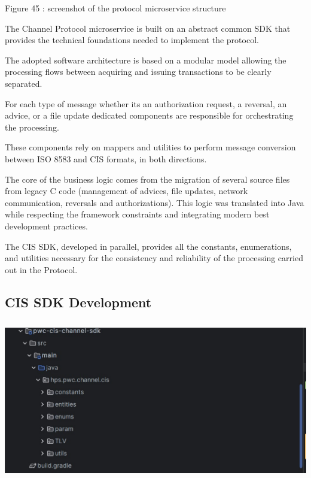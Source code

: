 \documentclass[12pt,a4paper]{report}
\begin{document}
\protect\hypertarget{_Toc201954521}{}{}Figure 45 : screenshot of the
protocol microservice structure

The Channel Protocol microservice is built on an abstract common SDK
that provides the technical foundations needed to implement the
protocol.

The adopted software architecture is based on a modular model allowing
the processing flows between acquiring and issuing transactions to be
clearly separated.

For each type of message whether it\textquotesingle s an authorization
request, a reversal, an advice, or a file update dedicated components
are responsible for orchestrating the processing.

These components rely on mappers and utilities to perform message
conversion between ISO 8583 and CIS formats, in both directions.

The core of the business logic comes from the migration of several
source files from legacy C code (management of advices, file updates,
network communication, reversals and authorizations). This logic was
translated into Java while respecting the framework constraints and
integrating modern best development practices.

The CIS SDK, developed in parallel, provides all the constants,
enumerations, and utilities necessary for the consistency and
reliability of the processing carried out in the Protocol.

\hypertarget{cis-sdk-development}{%
\subsection{\texorpdfstring{\textbf{CIS SDK
Development}}{CIS SDK Development}}\label{cis-sdk-development}}

\includegraphics[width=5.53797in,height=2.75347in]{vertopal_d1b0b2209edd4c6aa8254f57daa0953b/media/image65.jpg}
\end{document}
